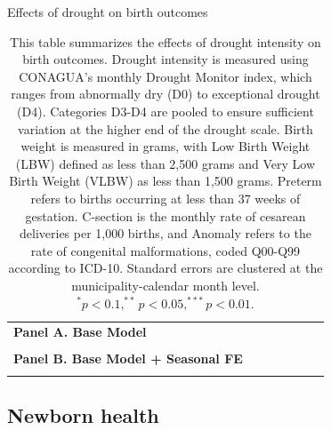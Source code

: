 \documentclass[12pt, oneside]{article}      %
\begin{document}
\begin{table}[!ht]
\begin{center}
\caption{Effects of drought on birth outcomes}\label{tab:results_at_birth_drought}
\fontsize{10pt}{12pt}\selectfont
\begin{tabularx}{\textwidth}{Xcccccc}
\toprule

\textbf{Panel A. Base Model} & & & & & \\
 \\
\midrule
\textbf{Panel B. Base Model + Seasonal FE} & & & & & \\
 \\

\bottomrule
\end{tabularx}
\noindent
\caption*{\footnotesize{This table summarizes the effects of drought intensity on birth outcomes. Drought intensity is measured using CONAGUA's monthly Drought Monitor index, which ranges from abnormally dry (D0) to exceptional drought (D4). Categories D3-D4 are pooled to ensure sufficient variation at the higher end of the drought scale. Birth weight is measured in grams, with Low Birth Weight (LBW) defined as less than 2,500 grams and Very Low Birth Weight (VLBW) as less than 1,500 grams. Preterm refers to births occurring at less than 37 weeks of gestation. C-section is the monthly rate of cesarean deliveries per 1,000 births, and Anomaly refers to the rate of congenital malformations, coded Q00-Q99 according to ICD-10. Standard errors are clustered at the municipality-calendar month level. $^* p<0.1, ^{**} p<0.05, ^{***} p<0.01$.}}
\end{center}
\end{table}

\clearpage
\newpage

\subsection{Newborn health}



\clearpage
\newpage
\end{document}
